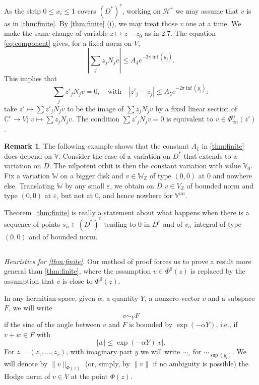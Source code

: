 \documentclass[11pt,a4paper]{article}
\theoremstyle{plain}
\theoremstyle{definition}
\newtheorem{remark}[theorem]{Remark}
\begin{document}
As the strip $0\leq x_i\leq 1$ covers $(D^*)^r$, working on $\mathcal{H}^r$ we may assume that $v$ is as in \ref{thm:finite}. By \ref{thm:finite} (i), we may treat those $v$ one at a time. We make the same change of variable $z\mapsto z-z_0$ as in 2.7. The equation \eqref{eq:component} gives, for a fixed norm on $V$,
\[
|\sum_j z_j N_j v|\leq A_4 e^{-2\pi\inf(y_j)}.
\]
This implies that
\[
\sum_j z'_j N_j v=0,\quad\text{with}\quad |z'_j-z_j|\leq A_5 e^{-2\pi\inf(y_j)}:
\]
take $z'\mapsto\sum z'_j N_j v$ to be the image of $\sum z_j N_j v$ by a fixed linear section of $\mathbb{C}^r\to V$; $v\mapsto\sum z_j N_j v$. The condition $\sum z'_j N_j v=0$ is equivalent to $v\in\Phi_{un}^0(z')$.

\begin{remark}
The following example shows that the constant $A_1$ in \ref{thm:finite} does depend on $\mathbb{V}$. Consider the case of a variation on $D^*$ that extends to a variation on $D$. The nilpotent orbit is then the constant variation with value $\mathbb{V}_0$. Fix a variation $\mathbb{W}$ on a bigger disk and $v\in\mathbb{W}_{\mathbb{Z}}$ of type $(0,0)$ at $0$ and nowhere else. Translating $\mathbb{W}$ by any small $\varepsilon$, we obtain on $D$ $v\in V_{\mathbb{Z}}$ of bounded norm and type $(0,0)$ at $\varepsilon$, but not at $0$, and hence nowhere for $\mathbb{V}^{un}$.
\end{remark}

Theorem~\ref{thm:finite} is really a statement about what happens when there is a sequence of points $s_{\alpha}\in(D^*)^r$ tending to $0$ in $D^r$ and of $v_{\alpha}$ integral of type $(0,0)$ and of bounded norm.

\subsection{}
\textit{Heuristics for \ref{thm:finite}.} Our method of proof forces us to prove a result more general than \ref{thm:finite}, where the assumption $v\in\Phi^0(z)$ is replaced by the assumption that $v$ is close to $\Phi^0(z)$.

In any hermitian space, given $\alpha$, a quantity $Y$, a nonzero vector $v$ and a subspace $F$, we will write
\[
v\sim_Y F
\]
if the sine of the angle between $v$ and $F$ is bounded by $\exp(-\alpha Y)$, i.e., if $v+w\in F$ with
\[
|w|\leq\exp(-\alpha Y)|v|.
\]
For $z=(z_1,\dots,z_r)$, with imaginary part $y$ we will write $\sim_z$ for $\sim_{\sup(y_i)}$. We will denote by $\|v\|_{\Phi(z)}$ (or, simply, by $\|v\|$ if no ambiguity is possible) the Hodge norm of $v\in V$ at the point $\Phi(z)$.
\end{document}
